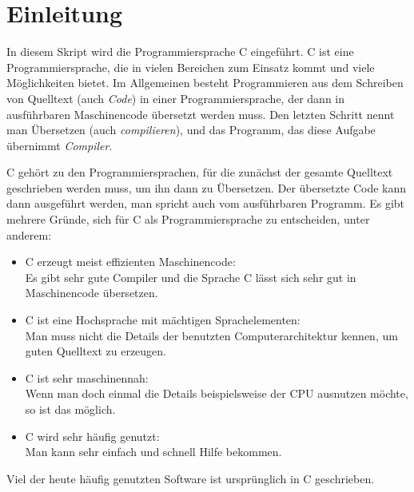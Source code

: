 \section{Einleitung}

In diesem Skript wird die Programmiersprache C eingeführt. 
C ist eine Programmiersprache, die in vielen Bereichen zum Einsatz kommt und viele Möglichkeiten bietet.
Im Allgemeinen besteht Programmieren aus dem Schreiben von Quelltext (auch \emph{Code}) in einer Programmiersprache, der dann in ausführbaren Maschinencode übersetzt werden muss. 
Den letzten Schritt nennt man Übersetzen (auch \emph{compilieren}), und das Programm, das diese Aufgabe übernimmt \emph{Compiler}.

C gehört zu den Programmiersprachen, für die zunächst der gesamte Quelltext geschrieben werden muss, um ihn dann zu Übersetzen. 
Der übersetzte Code kann dann ausgeführt werden, man spricht auch vom ausführbaren Programm.
Es gibt mehrere Gründe, sich für C als Programmiersprache zu entscheiden, unter anderem:
\begin{itemize}
\item C erzeugt meist effizienten Maschinencode:\\
  Es gibt sehr gute Compiler und die Sprache C lässt sich sehr gut in Maschinencode übersetzen.
\item C ist eine Hochsprache mit mächtigen Sprachelementen:\\
  Man muss nicht die Details der benutzten Computerarchitektur kennen, um guten Quelltext zu erzeugen.
\item C ist sehr maschinennah:\\
  Wenn man doch einmal die Details beispielsweise der CPU ausnutzen möchte, so ist das möglich.
\item C wird sehr häufig genutzt:\\
  Man kann sehr einfach und schnell Hilfe bekommen.
\end{itemize}
Viel der heute häufig genutzten Software ist ursprünglich in C geschrieben.

